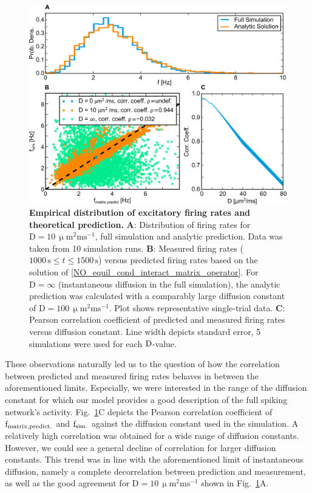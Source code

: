 \documentclass[10pt,letterpaper]{article}
\begin{document}
\begin{figure}
\includegraphics[width=\textwidth]{./figures/matrix_predict_comp_figure_new.png}
\caption{{\bf Empirical distribution of excitatory firing rates and theoretical prediction.} \textbf{A}: Distribution of firing rates for $\mathrm{D=10\, \upmu m^2 ms^{-1}}$, full simulation and analytic prediction. Data was taken from 10 simulation runs. \textbf{B}: Measured firing rates ($\mathrm{ 1000\,s} \leq t \leq \mathrm{1500\, s}$) versus predicted firing rates based on the solution of  \eqref{NO_equil_cond_interact_matrix_operator}. For $\mathrm{D=\infty}$ (instantaneous diffusion in the full simulation), the analytic prediction was calculated with a comparably large diffusion constant of $\mathrm{D=100\, \upmu m^2 ms^{-1}}$. Plot shows representative single-trial data. \textbf{C}: Pearson correlation coefficient of predicted and measured firing rates versus diffusion constant. Line width depicts standard error, 5 simulations were used for each $\rm D$-value.}
\label{Matrix_Predict_Comp}
\end{figure}

These observations naturally led us to the question of how the correlation between predicted and measured firing rates behaves in between the aforementioned limits. Especially, we were interested in the range of the diffusion constant for which our model provides a good description of the full spiking network's activity. Fig.~\ref{Matrix_Predict_Comp}C depicts the Pearson correlation coefficient of $\mathrm{f_{\rm matrix, predict.}}$ and $\mathrm{f_{\rm sim.}}$ against the diffusion constant used in the simulation. A relatively high correlation was obtained for a wide range of diffusion constants. However, we could see a general decline of correlation for larger diffusion constants. This trend was in line with the aforementioned limit of instantaneous diffusion, namely a complete decorrelation between prediction and measurement, as well as the good agreement for $\mathrm{D= 10\, \upmu m^2 ms^{-1}}$ shown in Fig.~\ref{Matrix_Predict_Comp}A.
\end{document}
